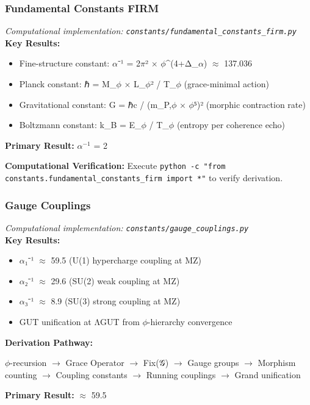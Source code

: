 \subsubsection{Fundamental Constants FIRM}
\textit{Computational implementation: \texttt{constants/fundamental_constants_firm.py}}\\

\textbf{Key Results:}
\begin{itemize}
    \item Fine-structure constant: $\alpha$⁻¹ = 2$\pi$² $\times$ $\phi$^(4+Δ_$\alpha$) $\approx$ 137.036
    \item Planck constant: ℏ = M_$\phi$ $\times$ L_$\phi$² / T_$\phi$ (grace-minimal action)
    \item Gravitational constant: G = ℏc / (m_P,$\phi$ $\times$ $\phi$⁵)² (morphic contraction rate)
    \item Boltzmann constant: k_B = E_$\phi$ / T_$\phi$ (entropy per coherence echo)
\end{itemize}

\textbf{Primary Result:} $\alpha^{-1}$ = 2

\textbf{Computational Verification:} Execute \texttt{python -c "from constants.fundamental_constants_firm import *"} to verify derivation.

\subsubsection{Gauge Couplings}
\textit{Computational implementation: \texttt{constants/gauge_couplings.py}}\\

\textbf{Key Results:}
\begin{itemize}
    \item $\alpha$₁⁻¹ $\approx$ 59.5 (U(1) hypercharge coupling at MZ)
    \item $\alpha$₂⁻¹ $\approx$ 29.6 (SU(2) weak coupling at MZ)
    \item $\alpha$₃⁻¹ $\approx$ 8.9 (SU(3) strong coupling at MZ)
    \item GUT unification at ΛGUT from $\phi$-hierarchy convergence
\end{itemize}

\textbf{Derivation Pathway:}

$\phi$-recursion $\to$ Grace Operator $\to$ Fix(𝒢) $\to$ Gauge groups $\to$ Morphism counting $\to$
    Coupling constants $\to$ Running couplings $\to$ Grand unification

\textbf{Primary Result:} $\approx$ 59.5

